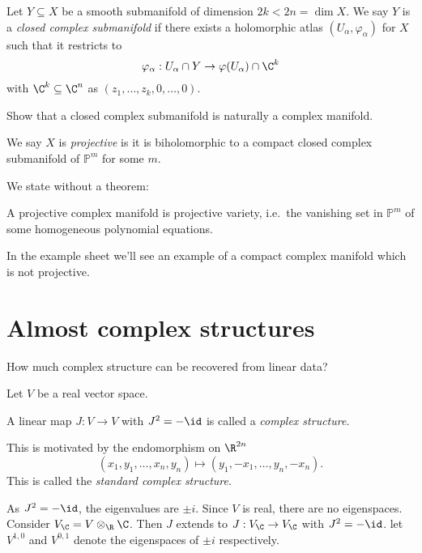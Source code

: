 \documentclass[a4paper]{article}
\renewcommand{\P}{\mathbb P} %
\begin{document}
\begin{definition}
  Let \(Y \subseteq X\) be a smooth submanifold of dimension \(2k < 2n = \dim X\). We say \(Y\) is a \emph{closed complex submanifold} if there exists a holomorphic atlas \((U_\alpha, \varphi_\alpha)\) for \(X\) such that it restricts to
  \[
    \varphi_\alpha: U_\alpha \cap Y \to \varphi(U_\alpha) \cap \C^k
  \]
  with \(\C^k \subseteq \C^n\) as \((z_1, \dots, z_k, 0, \dots, 0)\).
\end{definition}

\begin{ex}
  Show that a closed complex submanifold is naturally a complex manifold.
\end{ex}

\begin{definition}
  We say \(X\) is \emph{projective} is it is biholomorphic to a compact closed complex submanifold of \(\P^m\) for some \(m\).
\end{definition}

We state without a theorem:

\begin{theorem}[Chow]
  A projective complex manifold is projective variety, i.e.\ the vanishing set in \(\P^m\) of some homogeneous polynomial equations.
\end{theorem}

In the example sheet we'll see an example of a compact complex manifold which is not projective.

\section{Almost complex structures}

How much complex structure can be recovered from linear data?

Let \(V\) be a real vector space.

\begin{definition}
  A linear map \(J: V \to V\) with \(J^2 = - \id\) is called a \emph{complex structure}.
\end{definition}

This is motivated by the endomorphism on \(\R^{2n}\)
\[
  (x_1, y_1, \dots, x_n, y_n) \mapsto (y_1, -x_1, \dots, y_n, -x_n).
\]
This is called the \emph{standard complex structure}.

As \(J^2 = -\id\), the eigenvalues are \(\pm i\). Since \(V\) is real, there are no eigenspaces. Consider \(V_\C = V \otimes_\R \C\). Then \(J\) extends to \(J: V_\C \to V_\C\) with \(J^2 = -\id\). let \(V^{1, 0}\) and \(V^{0, 1}\) denote the eigenspaces of \(\pm i\) respectively.
\end{document}

